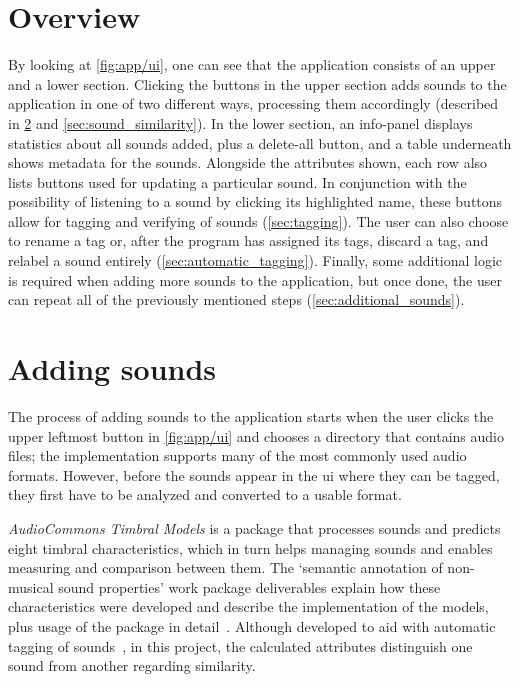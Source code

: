 \section{Overview}
By looking at \cref{fig:app/ui}, one can see that the application consists of an upper and a lower section. Clicking the buttons in the upper section adds sounds to the application in one of two different ways, processing them accordingly (described in \cref{sec:adding_sounds} and \cref{sec:sound_similarity}). In the lower section, an info-panel displays statistics about all sounds added, plus a delete-all button, and a table underneath shows metadata for the sounds. Alongside the attributes shown, each row also lists buttons used for updating a particular sound. In conjunction with the possibility of listening to a sound by clicking its highlighted name, these buttons allow for tagging and verifying of sounds (\cref{sec:tagging}). The user can also choose to rename a tag or, after the program has assigned its tags, discard a tag, and relabel a sound entirely (\cref{sec:automatic_tagging}). Finally, some additional logic is required when adding more sounds to the application, but once done, the user can repeat all of the previously mentioned steps (\cref{sec:additional_sounds}).

\section{Adding sounds}\label{sec:adding_sounds}
The process of adding sounds to the application starts when the user clicks the upper leftmost button in \cref{fig:app/ui} and chooses a directory that contains audio files; the implementation supports many of the most commonly used audio formats. However, before the sounds appear in the \gls{ui} where they can be tagged, they first have to be analyzed and converted to a usable format.

\emph{AudioCommons Timbral Models} is a package that processes sounds and predicts eight timbral characteristics, which in turn helps managing sounds and enables measuring and comparison between them. The `semantic annotation of non-musical sound properties' work package deliverables explain how these characteristics were developed and describe the implementation of the models, plus usage of the package in detail~\cite{rep:d5.1, rep:d5.2, rep:d5.3, rep:d5.6, rep:d5.7, rep:d5.8}. Although developed to aid with automatic tagging of sounds~\cite[4]{rep:d5.8}, in this project, the calculated attributes distinguish one sound from another regarding similarity.

